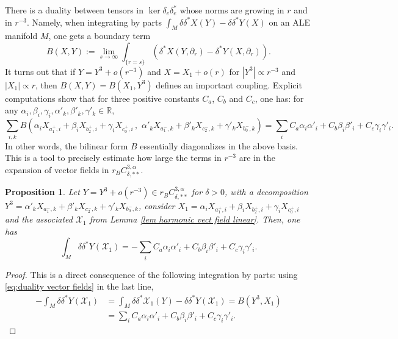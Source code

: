 \documentclass[11pt,reqno]{amsart}
\numberwithin{equation}{section}
\newtheorem{proposition}[thm]{Proposition}
\theoremstyle{definition}
\theoremstyle{remark}
\begin{document}
There is a duality between  tensors in $\ker \delta_e\delta^*_e$ whose norms are growing in $r$ and in $r^{-3}$. Namely, when integrating by parts $\int_M\delta\delta^*X(Y)-\delta\delta^*Y(X)$ on an ALE manifold $M$, one gets a boundary term $$B(X,Y):=\lim_{s\to\infty}\int_{\{r=s\}} \left(\delta^*X(Y,\partial_r)-\delta^*Y(X,\partial_r)\right).$$
It turns out that if $Y = Y^3 + o(r^{-3})$ and $X = X_1 + o(r)$ for $|Y^3|\propto r^{-3}$ and $|X_1|\propto r$, then $B(X,Y) = B(X_1,Y^3)$ defines an important coupling. Explicit computations show that for three positive constants $C_a$, $C_b$ and $C_c$, one has: for any $\alpha_i,\beta_i,\gamma_i,\alpha'_k,\beta'_k,\gamma'_k\in\mathbb{R}$,
\begin{equation}\label{eq:duality vector fields}
    \sum_{i,k}B\left(\alpha_i X_{a_1^+,i} + \beta_i X_{b_2^+,i} + \gamma_i X_{c_0^+,i}\,,\,\, \alpha'_k X_{a_1^-,k} + \beta'_k X_{c_2^-,k} + \gamma'_k X_{b_0^-,k}\right) = \sum_{i}C_a \alpha_i\alpha'_i + C_b\beta_i\beta'_i + C_c\gamma_i\gamma'_i.
\end{equation}
In other words, the bilinear form $B$ essentially diagonalizes in the above basis. This is a tool to precisely estimate how large the terms in $r^{-3}$ are in the expansion of vector fields in $r_BC^{3,\alpha}_{\delta,**}$.
\begin{proposition}\label{prop:duality vect fields
}
    Let $Y = Y^3 + o(r^{-3})\in r_BC^{3,\alpha}_{\delta,**}$ for $\delta>0$, with a decomposition $Y^3=\alpha'_k X_{a_1^-,k} + \beta'_k X_{c_2^-,k} + \gamma'_k X_{b_0^-,k}$, consider $X_1 = \alpha_i X_{a_1^+,i} + \beta_i X_{b_2^+,i} + \gamma_i X_{c_0^+,i}$ and the associated $\mathcal{X}_1$ from Lemma \ref{lem harmonic vect field linear}. Then, one has 
$$\int_M\delta\delta^*Y(\mathcal{X}_1)=-\sum_{i}C_a \alpha_i\alpha'_i + C_b\beta_i\beta'_i + C_c\gamma_i\gamma'_i.$$

\vspace{-0.3cm}

\end{proposition}
\begin{proof}
    This is a direct consequence of the following integration by parts: using \eqref{eq:duality vector fields} in the last line,
\begin{align*}
    -\int_M\delta\delta^*Y(\mathcal{X}_1)&=\int_M\delta\delta^*\mathcal{X}_1(Y)-\delta\delta^*Y(\mathcal{X}_1)= B(Y^3,X_1)\\
    &=\sum_{i}C_a \alpha_i\alpha'_i + C_b\beta_i\beta'_i + C_c\gamma_i\gamma'_i.
\end{align*}
\end{proof}
\end{document}
